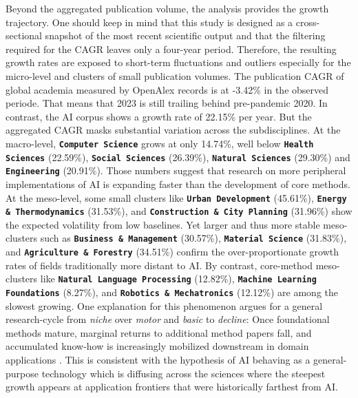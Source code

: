 \documentclass{article}
\begin{document}
	Beyond the aggregated publication volume, the analysis provides the growth trajectory. One should keep in mind that this study is designed as a cross-sectional snapshot of the most recent scientific output and that the filtering required for the CAGR leaves only a four-year period. Therefore, the resulting growth rates are exposed to short-term fluctuations and outliers especially for the micro-level and clusters of small publication volumes. The publication CAGR of global academia measured by OpenAlex records is at -3.42\% in the observed periode. That means that 2023 is still trailing behind pre-pandemic 2020. In contrast, the AI corpus shows a growth rate of 22.15\% per year. But the aggregated CAGR masks substantial variation across the subdisciplines. At the macro-level, \textbf{\texttt{Computer Science}}  grows at only 14.74\%, well below \textbf{\texttt{Health Sciences}}  (22.59\%), \textbf{\texttt{Social Sciences}}  (26.39\%), \textbf{\texttt{Natural Sciences}}  (29.30\%) and \textbf{\texttt{Engineering}}  (20.91\%). Those numbers suggest that research on more peripheral implementations of AI is expanding faster than the development of core methods. At the meso-level, some small clusters like \textbf{\texttt{Urban Development}}  (45.61\%), \textbf{\texttt{Energy \& Thermodynamics}}  (31.53\%), and \textbf{\texttt{Construction \& City Planning}}  (31.96\%) show the expected volatility from low baselines. Yet larger and thus more stable meso-clusters such as \textbf{\texttt{Business \& Management}}  (30.57\%), \textbf{\texttt{Material Science}}  (31.83\%), and \textbf{\texttt{Agriculture \& Forestry}}  (34.51\%) confirm the over-proportionate growth rates of fields traditionally more distant to AI. By contrast, core-method meso-clusters like \textbf{\texttt{Natural Language Processing}}  (12.82\%), \textbf{\texttt{Machine Learning Foundations}}  (8.27\%), and \textbf{\texttt{Robotics \& Mechatronics}}  (12.12\%) are among the slowest growing. One explanation for this phenomenon argues for a general research-cycle from \textit{niche} over \textit{motor} and \textit{basic} to \textit{decline}: Once foundational methods mature, marginal returns to additional method papers fall, and accumulated know-how is increasingly mobilized downstream in domain applications \cite{Belfiore2022Characterising}. This is consistent with the hypothesis of AI behaving as a general-purpose technology which is diffusing across the sciences where the steepest growth appears at application frontiers that were historically farthest from AI.
	
\end{document}
